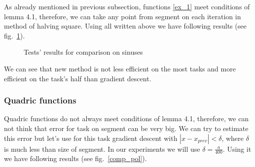 \documentclass[12pt]{article}
\begin{document}
As already mentioned in previous subsection, functions \eqref{ex_1} meet conditions of lemma 4.1, therefore, we can take any point from segment on each iteration in method of halving square. Using all written above we have following results (see fig.~\ref{comp_sinuses}).

\begin{figure}[h!]
\caption{Tests' results for comparison on sinuses}
\label{comp_sinuses}
\end{figure}

We can see that new method is not less efficient on the most tasks and more efficient on the task's half than gradient descent.

\subsubsection{Quadric functions}

Quadric functions do not always meet conditions of lemma 4.1, therefore, we can not think that error for task on segment can be very big. We can try to estimate this error but let's use for this task gradient descent with $|x-x_{prev}|<\delta$, where $\delta$ is much less than size of segment. In our experiments we will use $\delta = \frac{a}{400}$. Using it we have following results (see fig.~\ref{comp_pol}).
\end{document}
